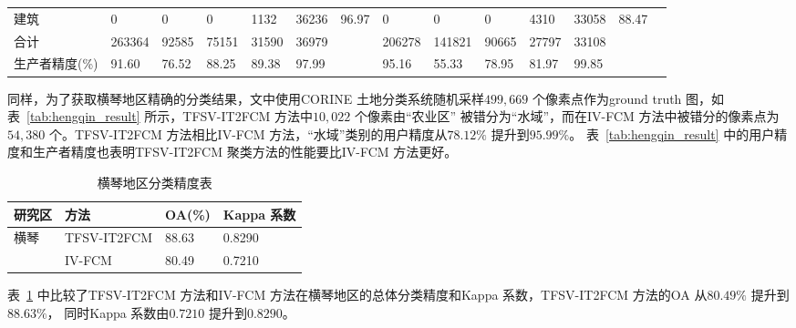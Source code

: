\begin{table}[htbp]
{\begin{adjustbox}{max width=1.15\textwidth}
\begin{tabular} {llllllllllllll}
            建筑                                          & 0                                        & 0                                                 & 0                          & 1132                                              & 36236 & 96.97 & 0      & 0      & 0     & 4310  & 33058 & 88.47 \\
            合计                                          & 263364                                   & 92585                                             & 75151                      & 31590                                             & 36979 &       & 206278 & 141821 & 90665 & 27797 & 33108 &       \\
            生产者精度(\%)                                & 91.60                                    & 76.52                                             & 88.25                      & 89.38                                             & 97.99 &       & 95.16  & 55.33  & 78.95 & 81.97 & 99.85 &       \\
            \bottomrule
        \end{tabular}
    \end{adjustbox}}
\end{table}

同样，为了获取横琴地区精确的分类结果，文中使用CORINE 土地分类系统随机采样$499,669$ 个像素点作为ground truth 图，如表~\ref{tab:hengqin_result} 所示，TFSV-IT2FCM 方法中$10,022$ 个像素由“农业区” 被错分为“水域”，而在IV-FCM 方法中被错分的像素点为$54,380$ 个。TFSV-IT2FCM 方法相比IV-FCM 方法，“水域”类别的用户精度从$78.12\%$ 提升到$95.99\%$。 表~\ref{tab:hengqin_result} 中的用户精度和生产者精度也表明TFSV-IT2FCM 聚类方法的性能要比IV-FCM 方法更好。

\begin{table}[htbp]
    \caption{横琴地区分类精度表}\label{tab:hengqin_oa}
    \centering
    \begin{tabular}{llll}
        \toprule
        研究区 & 方法        & OA(\%) & Kappa 系数 \\
        \midrule
        横琴   & TFSV-IT2FCM & 88.63  & 0.8290     \\
               & IV-FCM      & 80.49  & 0.7210     \\
        \bottomrule
    \end{tabular}
\end{table}

表~\ref{tab:hengqin_oa} 中比较了TFSV-IT2FCM 方法和IV-FCM 方法在横琴地区的总体分类精度和Kappa 系数，TFSV-IT2FCM 方法的OA 从$80.49\%$ 提升到$88.63\%$， 同时Kappa 系数由$0.7210$ 提升到$0.8290$。

